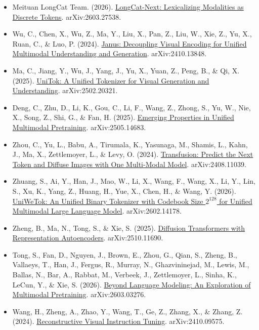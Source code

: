 \begin{itemize}
\tightlist
\item
  Meituan LongCat Team. (2026). \href{https://arxiv.org/abs/2603.27538}{LongCat-Next: Lexicalizing Modalities as Discrete Tokens}. arXiv:2603.27538.
\item
  Wu, C., Chen, X., Wu, Z., Ma, Y., Liu, X., Pan, Z., Liu, W., Xie, Z., Yu, X., Ruan, C., \& Luo, P. (2024). \href{https://arxiv.org/abs/2410.13848}{Janus: Decoupling Visual Encoding for Unified Multimodal Understanding and Generation}. arXiv:2410.13848.
\item
  Ma, C., Jiang, Y., Wu, J., Yang, J., Yu, X., Yuan, Z., Peng, B., \& Qi, X. (2025). \href{https://arxiv.org/abs/2502.20321}{UniTok: A Unified Tokenizer for Visual Generation and Understanding}. arXiv:2502.20321.
\item
  Deng, C., Zhu, D., Li, K., Gou, C., Li, F., Wang, Z., Zhong, S., Yu, W., Nie, X., Song, Z., Shi, G., \& Fan, H. (2025). \href{https://arxiv.org/abs/2505.14683}{Emerging Properties in Unified Multimodal Pretraining}. arXiv:2505.14683.
\item
  Zhou, C., Yu, L., Babu, A., Tirumala, K., Yasunaga, M., Shamis, L., Kahn, J., Ma, X., Zettlemoyer, L., \& Levy, O. (2024). \href{https://arxiv.org/abs/2408.11039}{Transfusion: Predict the Next Token and Diffuse Images with One Multi-Modal Model}. arXiv:2408.11039.
\item
  Zhuang, S., Ai, Y., Han, J., Mao, W., Li, X., Wang, F., Wang, X., Li, Y., Lin, S., Xu, K., Yang, Z., Huang, H., Yue, X., Chen, H., \& Wang, Y. (2026). \href{https://arxiv.org/abs/2602.14178}{UniWeTok: An Unified Binary Tokenizer with Codebook Size \(2^{128}\) for Unified Multimodal Large Language Model}. arXiv:2602.14178.
\item
  Zheng, B., Ma, N., Tong, S., \& Xie, S. (2025). \href{https://arxiv.org/abs/2510.11690}{Diffusion Transformers with Representation Autoencoders}. arXiv:2510.11690.
\item
  Tong, S., Fan, D., Nguyen, J., Brown, E., Zhou, G., Qian, S., Zheng, B., Vallaeys, T., Han, J., Fergus, R., Murray, N., Ghazvininejad, M., Lewis, M., Ballas, N., Bar, A., Rabbat, M., Verbeek, J., Zettlemoyer, L., Sinha, K., LeCun, Y., \& Xie, S. (2026). \href{https://arxiv.org/abs/2603.03276}{Beyond Language Modeling: An Exploration of Multimodal Pretraining}. arXiv:2603.03276.
\item
  Wang, H., Zheng, A., Zhao, Y., Wang, T., Ge, Z., Zhang, X., \& Zhang, Z. (2024). \href{https://arxiv.org/abs/2410.09575}{Reconstructive Visual Instruction Tuning}. arXiv:2410.09575.
\end{itemize}

